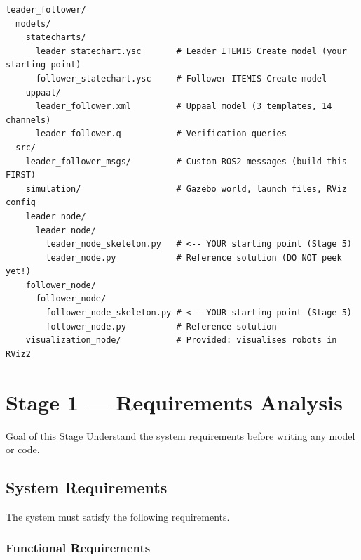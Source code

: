 \documentclass[11pt, a4paper]{article}
\begin{document}
\begin{lstlisting}[style=shellcode]
leader_follower/
  models/
    statecharts/
      leader_statechart.ysc       # Leader ITEMIS Create model (your starting point)
      follower_statechart.ysc     # Follower ITEMIS Create model
    uppaal/
      leader_follower.xml         # Uppaal model (3 templates, 14 channels)
      leader_follower.q           # Verification queries
  src/
    leader_follower_msgs/         # Custom ROS2 messages (build this FIRST)
    simulation/                   # Gazebo world, launch files, RViz config
    leader_node/
      leader_node/
        leader_node_skeleton.py   # <-- YOUR starting point (Stage 5)
        leader_node.py            # Reference solution (DO NOT peek yet!)
    follower_node/
      follower_node/
        follower_node_skeleton.py # <-- YOUR starting point (Stage 5)
        follower_node.py          # Reference solution
    visualization_node/           # Provided: visualises robots in RViz2
\end{lstlisting}

\newpage
\section{Stage 1 — Requirements Analysis}

\begin{infobox}{Goal of this Stage}
Understand the system requirements before writing any model or code.
\end{infobox}

\subsection{System Requirements}

The system must satisfy the following requirements.

\subsubsection{Functional Requirements}
\end{document}
